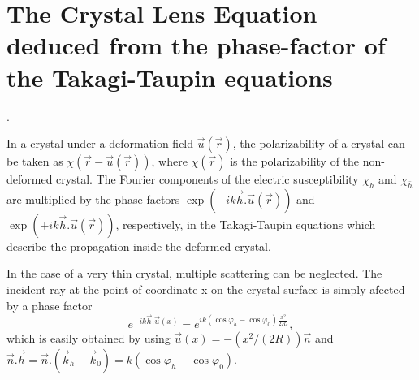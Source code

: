 \documentclass[preprint]{iucr}              %
\begin{document}




\appendix
\section{The Crystal Lens Equation deduced from the phase-factor of the Takagi-Taupin equations}
\label{appendix:CLE}.

In a crystal under a deformation field $\vec u(\vec r)$, the polarizability of a crystal can be taken as $\chi(\vec r-\vec u(\vec r))$, where $\chi(\vec r)$ is the polarizability of the non-deformed crystal. The Fourier components of the electric susceptibility $\chi_h$ and $\chi_{\bar h}$ are multiplied by the phase factors $\exp(-i k \vec h . \vec u (\vec r))$ and $\exp(+i k \vec h . \vec u (\vec r))$, respectively, in the Takagi-Taupin equations which describe  the propagation inside the deformed crystal.

In the case of a very thin crystal, multiple scattering can be neglected. The incident ray at the point of coordinate x on the crystal surface is simply afected by a phase factor 
\begin{equation}
    e^{-i k \vec h . \vec u(x)} = e^{i k (\cos\varphi_h-\cos\varphi_0) \frac{x^2}{2 R_c} },
\end{equation}
which is easily obtained by using $\vec u(x) = -(x^2/(2R))\vec n$ and $\vec n . \vec h = \vec n.(\vec k_h - \vec k_0) = k(\cos\varphi_h-\cos\varphi_0)$. 
\end{document}
